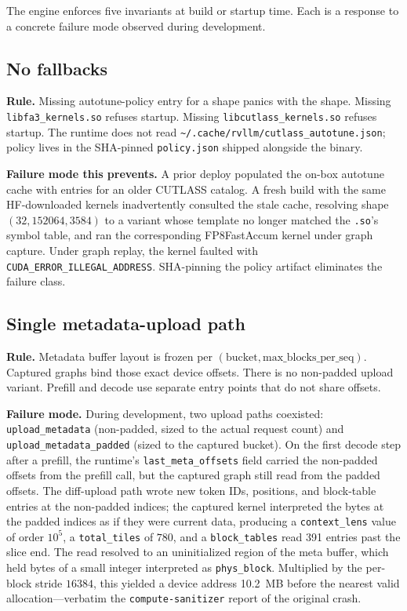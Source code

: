 The engine enforces five invariants at build or startup time. Each is
a response to a concrete failure mode observed during development.

\subsection{No fallbacks}

\textbf{Rule.} Missing autotune-policy entry for a shape panics with the
shape. Missing \texttt{libfa3\_kernels.so} refuses startup. Missing
\texttt{libcutlass\_kernels.so} refuses startup. The runtime does not
read \texttt{\textasciitilde/.cache/rvllm/cutlass\_autotune.json}; policy
lives in the SHA-pinned \texttt{policy.json} shipped alongside the
binary.

\textbf{Failure mode this prevents.} A prior deploy populated the
on-box autotune cache with entries for an older CUTLASS catalog. A
fresh build with the same HF-downloaded kernels inadvertently consulted
the stale cache, resolving shape $(32, 152064, 3584)$ to a variant
whose template no longer matched the \texttt{.so}'s symbol table, and
ran the corresponding FP8FastAccum kernel under graph capture. Under
graph replay, the kernel faulted with
\texttt{CUDA\_ERROR\_ILLEGAL\_ADDRESS}. SHA-pinning the policy
artifact eliminates the failure class.

\subsection{Single metadata-upload path}

\textbf{Rule.} Metadata buffer layout is frozen per
$(\text{bucket}, \text{max\_blocks\_per\_seq})$. Captured graphs bind
those exact device offsets. There is no non-padded upload variant.
Prefill and decode use separate entry points that do not share offsets.

\textbf{Failure mode.} During development, two upload paths coexisted:
\texttt{upload\_metadata} (non-padded, sized to the actual request
count) and \texttt{upload\_metadata\_padded} (sized to the captured
bucket). On the first decode step after a prefill, the runtime's
\texttt{last\_meta\_offsets} field carried the non-padded offsets from
the prefill call, but the captured graph still read from the padded
offsets. The diff-upload path wrote new token IDs, positions, and
block-table entries at the non-padded indices; the captured kernel
interpreted the bytes at the padded indices as if they were current
data, producing a \texttt{context\_lens} value of order $10^5$, a
\texttt{total\_tiles} of $780$, and a \texttt{block\_tables} read 391
entries past the slice end. The read resolved to an uninitialized
region of the meta buffer, which held bytes of a small
integer interpreted as \texttt{phys\_block}. Multiplied by the
per-block stride $16384$, this yielded a device address 10.2~MB before
the nearest valid allocation---verbatim the
\texttt{compute-sanitizer} report of the original crash.

